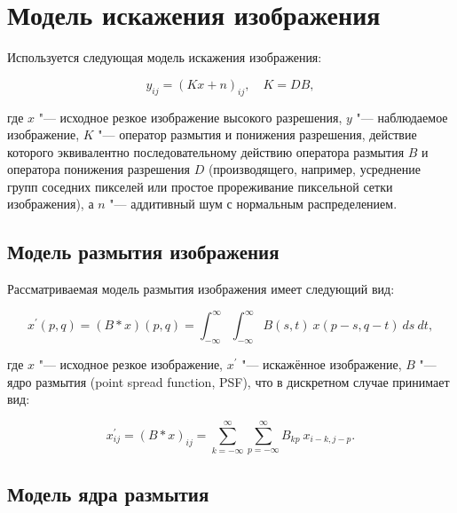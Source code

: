 \section{Модель искажения изображения}

Используется следующая модель искажения изображения:

\begin{equation*}
	y_{ij} = \left(Kx+n\right)_{ij},\quad K=DB,
\end{equation*}

\noindent где $x$ "--- исходное резкое изображение высокого разрешения, $y$ "--- наблюдаемое изображение, $K$ "--- оператор размытия и понижения разрешения, действие которого эквивалентно последовательному действию оператора размытия $B$ и оператора понижения разрешения $D$ (производящего, например, усреднение групп соседних пикселей или простое прореживание пиксельной сетки изображения), а $n$ "--- аддитивный шум с нормальным распределением.

\subsection{Модель размытия изображения} \label{sec:image-blur-model}

Рассматриваемая модель размытия изображения имеет следующий вид:

\begin{equation*}
	x^\prime \left(p, q\right) = \left(B \ast x\right) \left(p, q\right) = \int_{-\infty}^{\infty}\int_{-\infty}^{\infty}{B\left(s,t\right)\ x\left(p-s,q-t\right)\ ds\ dt},
\end{equation*}

\noindent где $x$ "--- исходное резкое изображение, $x^\prime$ "--- искажённое изображение, $B$ "--- ядро размытия (point spread function, PSF), что в дискретном случае принимает вид:

\begin{equation*}
	x^\prime_{ij} = \left(B \ast x\right)_{ij} = \sum_{k=-\infty}^{\infty} \sum_{p=-\infty}^{\infty}{B_{kp}\ x_{i-k,j-p}}.
\end{equation*}

\subsection{Модель ядра размытия} \label{sec:microscope-psf}

